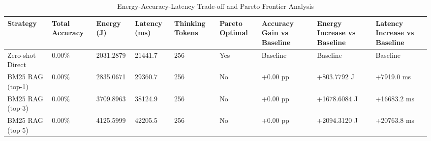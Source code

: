 \begin{table}
\caption{Energy-Accuracy-Latency Trade-off and Pareto Frontier Analysis}
\label{tab:tradeoff_comparison}
\begin{tabular}{lllllllll}
\toprule
Strategy & Total Accuracy & Energy (J) & Latency (ms) & Thinking Tokens & Pareto Optimal & Accuracy Gain vs Baseline & Energy Increase vs Baseline & Latency Increase vs Baseline \\
\midrule
Zero-shot Direct & 0.00\% & 2031.2879 & 21441.7 & 256 & Yes & Baseline & Baseline & Baseline \\
BM25 RAG (top-1) & 0.00\% & 2835.0671 & 29360.7 & 256 & No & +0.00 pp & +803.7792 J & +7919.0 ms \\
BM25 RAG (top-3) & 0.00\% & 3709.8963 & 38124.9 & 256 & No & +0.00 pp & +1678.6084 J & +16683.2 ms \\
BM25 RAG (top-5) & 0.00\% & 4125.5999 & 42205.5 & 256 & No & +0.00 pp & +2094.3120 J & +20763.8 ms \\
\bottomrule
\end{tabular}
\end{table}
